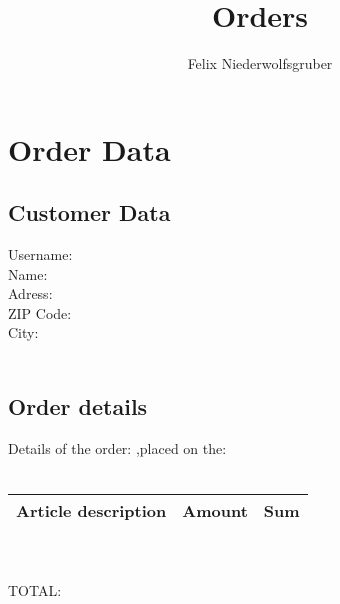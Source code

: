 \documentclass[10pt] {article}
\author{Felix Niederwolfsgruber}
\title{Orders}
\begin{document}
\section {Order Data}
\subsection {Customer Data}
Username: %
\\
Name: %
\\
Adress: %
\\
ZIP Code: %
\\
City: %
\\
\\
\subsection {Order details}
Details of the order: %
,placed on the:  
\\
\\
\begin {tabular} {|c|c|c|}
\hline Article description&Amount&Sum\\ \hline
\end {tabular}
\\
\\
TOTAL: %
\end{document}
